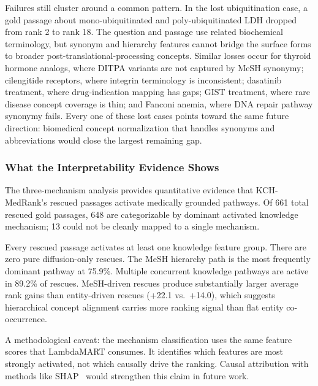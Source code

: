 Failures still cluster around a common pattern. In the lost ubiquitination case, a gold passage about mono-ubiquitinated and poly-ubiquitinated LDH dropped from rank 2 to rank 18. The question and passage use related biochemical terminology, but synonym and hierarchy features cannot bridge the surface forms to broader post-translational-processing concepts. Similar losses occur for thyroid hormone analogs, where DITPA variants are not captured by MeSH synonymy; cilengitide receptors, where integrin terminology is inconsistent; dasatinib treatment, where drug-indication mapping has gaps; GIST treatment, where rare disease concept coverage is thin; and Fanconi anemia, where DNA repair pathway synonymy fails. Every one of these lost cases points toward the same future direction: biomedical concept normalization that handles synonyms and abbreviations would close the largest remaining gap.

\subsubsection{What the Interpretability Evidence Shows}

The three-mechanism analysis provides quantitative evidence that KCH-MedRank's rescued passages activate medically grounded pathways. Of 661 total rescued gold passages, 648 are categorizable by dominant activated knowledge mechanism; 13 could not be cleanly mapped to a single mechanism.

Every rescued passage activates at least one knowledge feature group. There are zero pure diffusion-only rescues. The MeSH hierarchy path is the most frequently dominant pathway at 75.9\%. Multiple concurrent knowledge pathways are active in 89.2\% of rescues. MeSH-driven rescues produce substantially larger average rank gains than entity-driven rescues (+22.1 vs.\ +14.0), which suggests hierarchical concept alignment carries more ranking signal than flat entity co-occurrence.

A methodological caveat: the mechanism classification uses the same feature scores that LambdaMART consumes. It identifies which features are most strongly activated, not which causally drive the ranking. Causal attribution with methods like SHAP~\citep{lundberg2017unified} would strengthen this claim in future work.
